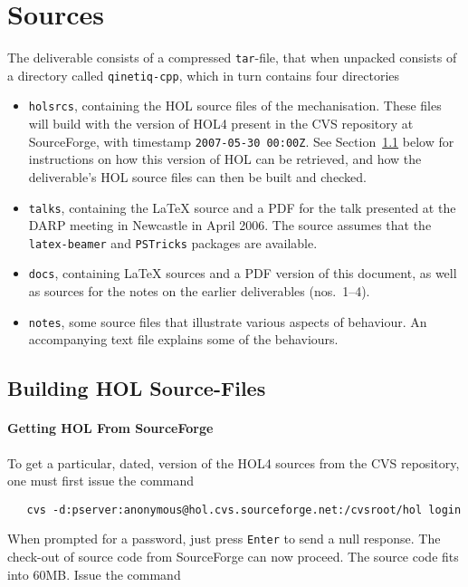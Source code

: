 \documentclass[11pt]{article}
\begin{document}
\appendix
\section{Sources}
\label{sec:sources}

The deliverable consists of a compressed \texttt{tar}-file, that when
unpacked consists of a directory called \texttt{qinetiq-cpp}, which in
turn contains four directories
\begin{itemize}
\item \texttt{holsrcs}, containing the HOL source files of the
  mechanisation.  These files will build with the version of HOL4
  present in the CVS repository at SourceForge, with timestamp
  \texttt{2007-05-30 00:00Z}.  See Section~\ref{sec:getting-hol}
  below for instructions on how this version of HOL can be retrieved,
  and how the deliverable's HOL source files can then be built and
  checked.
\item \texttt{talks}, containing the \LaTeX{} source and a PDF for the
  talk presented at the DARP meeting in Newcastle in April 2006.  The
  source assumes that the \texttt{latex-beamer} and \texttt{PSTricks}
  packages are available.
\item \texttt{docs}, containing \LaTeX{} sources and a PDF version of
  this document, as well as sources for the notes on the earlier
  deliverables (nos.~1--4).
\item \texttt{notes}, some \cpp{} source files that illustrate various
  aspects of \cpp{} behaviour.  An accompanying text file explains some
  of the behaviours.
\end{itemize}

\subsection{Building HOL Source-Files}
\label{sec:getting-hol}

\paragraph{Getting HOL From SourceForge}

To get a particular, dated, version of the HOL4 sources from the CVS
repository, one must first issue the command

{\small
\begin{verbatim}
   cvs -d:pserver:anonymous@hol.cvs.sourceforge.net:/cvsroot/hol login
\end{verbatim}
}

When prompted for a password, just press \texttt{Enter} to send a null
response.  The check-out of source code from SourceForge can now
proceed.  The source code fits into 60MB.  Issue the command
\end{document}
